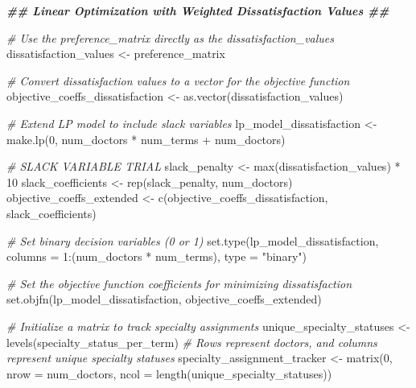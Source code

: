 \documentclass[
]{article}
\newenvironment{Shaded}{\begin{snugshade}}{\end{snugshade}}
\newcommand{\AttributeTok}[1]{\textcolor[rgb]{0.77,0.63,0.00}{#1}}
\newcommand{\CommentTok}[1]{\textcolor[rgb]{0.56,0.35,0.01}{\textit{#1}}}
\newcommand{\DecValTok}[1]{\textcolor[rgb]{0.00,0.00,0.81}{#1}}
\newcommand{\DocumentationTok}[1]{\textcolor[rgb]{0.56,0.35,0.01}{\textbf{\textit{#1}}}}
\newcommand{\FunctionTok}[1]{\textcolor[rgb]{0.00,0.00,0.00}{#1}}
\newcommand{\NormalTok}[1]{#1}
\newcommand{\OtherTok}[1]{\textcolor[rgb]{0.56,0.35,0.01}{#1}}
\newcommand{\SpecialCharTok}[1]{\textcolor[rgb]{0.00,0.00,0.00}{#1}}
\newcommand{\StringTok}[1]{\textcolor[rgb]{0.31,0.60,0.02}{#1}}
\begin{document}
\begin{Shaded}
\begin{Highlighting}[]
\DocumentationTok{\#\# Linear Optimization with Weighted Dissatisfaction Values \#\#}

\CommentTok{\# Use the preference\_matrix directly as the dissatisfaction\_values}
\NormalTok{dissatisfaction\_values }\OtherTok{\textless{}{-}}\NormalTok{ preference\_matrix}


\CommentTok{\# Convert dissatisfaction values to a vector for the objective function}
\NormalTok{objective\_coeffs\_dissatisfaction }\OtherTok{\textless{}{-}} \FunctionTok{as.vector}\NormalTok{(dissatisfaction\_values)}


\CommentTok{\# Extend LP model to include slack variables}
\NormalTok{lp\_model\_dissatisfaction }\OtherTok{\textless{}{-}} \FunctionTok{make.lp}\NormalTok{(}\DecValTok{0}\NormalTok{, num\_doctors }\SpecialCharTok{*}\NormalTok{ num\_terms }\SpecialCharTok{+}\NormalTok{ num\_doctors)}


\CommentTok{\# SLACK VARIABLE TRIAL}
\NormalTok{slack\_penalty }\OtherTok{\textless{}{-}} \FunctionTok{max}\NormalTok{(dissatisfaction\_values) }\SpecialCharTok{*} \DecValTok{10}
\NormalTok{slack\_coefficients }\OtherTok{\textless{}{-}} \FunctionTok{rep}\NormalTok{(slack\_penalty, num\_doctors)}
\NormalTok{objective\_coeffs\_extended }\OtherTok{\textless{}{-}} \FunctionTok{c}\NormalTok{(objective\_coeffs\_dissatisfaction, slack\_coefficients)}

\CommentTok{\# Set binary decision variables (0 or 1)}
\FunctionTok{set.type}\NormalTok{(lp\_model\_dissatisfaction, }\AttributeTok{columns =} \DecValTok{1}\SpecialCharTok{:}\NormalTok{(num\_doctors }\SpecialCharTok{*}\NormalTok{ num\_terms), }\AttributeTok{type =} \StringTok{"binary"}\NormalTok{)}

\CommentTok{\# Set the objective function coefficients for minimizing dissatisfaction}
\FunctionTok{set.objfn}\NormalTok{(lp\_model\_dissatisfaction, objective\_coeffs\_extended)}

\CommentTok{\# Initialize a matrix to track specialty assignments}
\NormalTok{unique\_specialty\_statuses }\OtherTok{\textless{}{-}} \FunctionTok{levels}\NormalTok{(specialty\_status\_per\_term)}
\CommentTok{\# Rows represent doctors, and columns represent unique specialty statuses}
\NormalTok{specialty\_assignment\_tracker }\OtherTok{\textless{}{-}} \FunctionTok{matrix}\NormalTok{(}\DecValTok{0}\NormalTok{, }\AttributeTok{nrow =}\NormalTok{ num\_doctors, }\AttributeTok{ncol =} \FunctionTok{length}\NormalTok{(unique\_specialty\_statuses))}


\end{Highlighting}
\end{Shaded}
\end{document}
